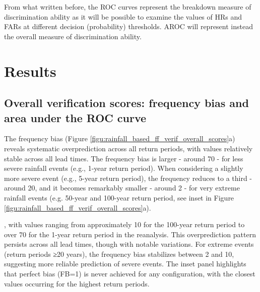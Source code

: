 From what written before, the ROC curves represent the breakdown measure of discrimination ability as it will be possible to examine the values of HRs and FARs at different decision (probability) thresholds. AROC will represent instead the overall measure of discrimination ability.

\section{Results}
\label{flash_flood_focused_verification_rainfall_based_ff_RESULTS}


\subsection{Overall verification scores: frequency bias and area under the ROC curve}

The  frequency bias (Figure \ref{figu:rainfall_based_ff_verif_overall_scores}a) reveals systematic overprediction across all return periods, with values relatively stable across all lead times. The frequency bias is larger - around 70 - for less severe rainfall events (e.g., 1-year return period). When considering a slightly more severe event (e.g., 5-year return period), the frequency reduces to a third - around 20, and it becomes remarkably smaller - around 2 - for very extreme rainfall events (e.g. 50-year and 100-year return period, see inset in Figure \ref{figu:rainfall_based_ff_verif_overall_scores}a). 







, with values ranging from approximately 10 for the 100-year return period to over 70 for the 1-year return period in the reanalysis. This overprediction pattern persists across all lead times, though with notable variations. For extreme events (return periods ≥20 years), the frequency bias stabilizes between 2 and 10, suggesting more reliable prediction of severe events. The inset panel highlights that perfect bias (FB=1) is never achieved for any configuration, with the closest values occurring for the highest return periods.




